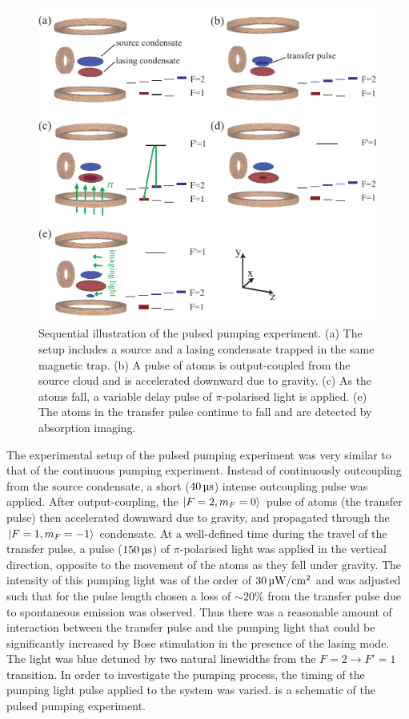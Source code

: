 \begin{figure}
    \centering
    \includegraphics[width=12cm]{PulsedPumpingScheme}
    \caption{Sequential illustration of the pulsed pumping experiment. (a) The setup includes a source and a lasing condensate trapped in the same magnetic trap. (b) A pulse of atoms is output-coupled from the source cloud and is accelerated downward due to gravity. (c) As the atoms fall, a variable delay pulse of $\pi$-polarised light is applied. (e) The atoms in the transfer pulse continue to fall and are detected by absorption imaging.}
    \label{OpticalPumping:PulsedPumpingScheme}
\end{figure}


The experimental setup of the pulsed pumping experiment was very similar to that of the continuous pumping experiment.  Instead of continuously outcoupling from the source condensate, a short ($\unit[40]{\micro s}$) intense outcoupling pulse was applied.  After output-coupling, the ${\left|F=2, m_F=0\right>}$ pulse of atoms (the transfer pulse) then accelerated downward due to gravity, and propagated through the ${\left|F=1, m_F=-1\right>}$ condensate.  At a well-defined time during the travel of the transfer pulse, a pulse ($\unit[150]{\micro s}$) of $\pi$-polarised light was applied in the vertical direction, opposite to the movement of the atoms as they fell under gravity.  The intensity of this pumping light was of the order of $\unit[30]{\micro W/cm\textsuperscript{2}}$ and was adjusted such that for the pulse length chosen a loss of $\sim 20\%$ from the transfer pulse due to spontaneous emission was observed.  Thus there was a reasonable amount of interaction between the transfer pulse and the pumping light that could be significantly increased by Bose stimulation in the presence of the lasing mode.  The light was blue detuned by two natural linewidths from the $F=2 \rightarrow F'=1$ transition.  In order to investigate the pumping process, the timing of the pumping light pulse applied to the system was varied.   is a schematic of the pulsed pumping experiment.

